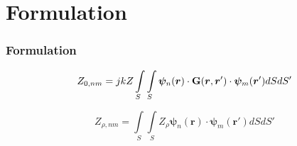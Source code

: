 \section{Formulation}


\begin{frame}
\frametitle{Formulation}

\begin{equation}
    Z_{0,nm} = j k Z \int \limits_S \int\limits_S \bm{\psi}_n(\bm{r}) \cdot \bold{G} (\bm{r},\bm{r}') \cdot \bm{\psi}_m(\bm{r}') dS dS'
    \label{eq:mom_reaction_integral}
\end{equation}

\begin{equation}
    Z_{\rho,nm} = \int \limits_S \int\limits_S Z_\rho \bm{\psi}_n(\bm{r}) \cdot \bm{\psi}_m(\bm{r}') dS dS'
    \label{eq:mom_reaction_integral2}
\end{equation}
\end{frame}
